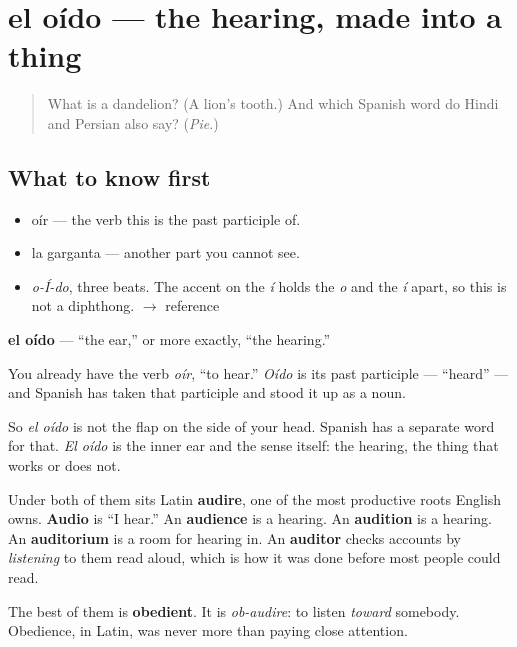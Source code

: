 \section[el oído]{el oído — the hearing, made into a thing}

\label{lesson:ES-C314-oido}



\begin{quote}
What is a dandelion? (A lion's tooth.) And which Spanish word do Hindi and Persian also say? (\emph{Pie}.)
\end{quote}

\subsection*{What to know first}
\begin{itemize}
\raggedright
  \item oír — the verb this is the past participle of.
  \item la garganta — another part you cannot see.
\end{itemize}

\begin{sounds}
\begin{itemize}
\raggedright
  \item \emph{o-Í-do}, three beats. The accent on the \emph{í} holds the \emph{o} and the \emph{í} apart, so this is not a diphthong. $\to$ reference
\end{itemize}
\end{sounds}

\begin{cousinweb}
\textbf{el oído} — \textquotedblleft{}the ear,\textquotedblright{} or more exactly, \textquotedblleft{}the hearing.\textquotedblright{}

You already have the verb \emph{oír}, \textquotedblleft{}to hear.\textquotedblright{} \emph{Oído} is its past participle — \textquotedblleft{}heard\textquotedblright{} — and Spanish has taken that participle and stood it up as a noun.

So \emph{el oído} is not the flap on the side of your head. Spanish has a separate word for that. \emph{El oído} is the inner ear and the sense itself: the hearing, the thing that works or does not.

Under both of them sits Latin \textbf{audire}, one of the most productive roots English owns. \textbf{Audio} is \textquotedblleft{}I hear.\textquotedblright{} An \textbf{audience} is a hearing. An \textbf{audition} is a hearing. An \textbf{auditorium} is a room for hearing in. An \textbf{auditor} checks accounts by \emph{listening} to them read aloud, which is how it was done before most people could read.

The best of them is \textbf{obedient}. It is \emph{ob-audire}: to listen \emph{toward} somebody. Obedience, in Latin, was never more than paying close attention.
\end{cousinweb}

